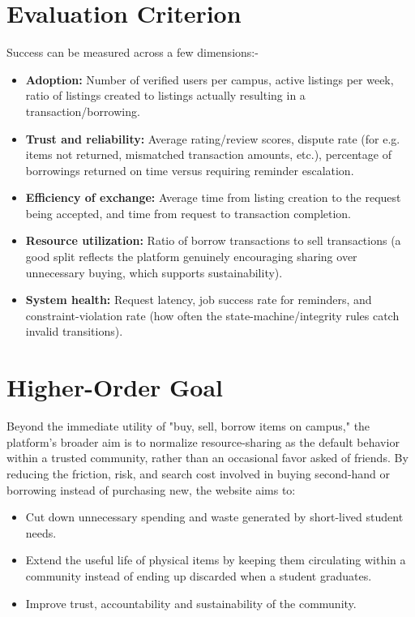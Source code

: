 \documentclass[12pt,a4paper]{article}
\begin{document}
\section{Evaluation Criterion}
Success can be measured across a few dimensions:-
\begin{itemize}[leftmargin=0.7cm]
    \item \textbf{Adoption:} Number of verified users per campus, active listings per week, ratio of listings created to listings actually resulting in a transaction/borrowing.
    \item \textbf{Trust and reliability:} Average rating/review scores, dispute rate (for e.g. items not returned, mismatched transaction amounts, etc.), percentage of borrowings returned on time versus requiring reminder escalation.
    \item \textbf{Efficiency of exchange:} Average time from listing creation to the request being accepted, and time from request to transaction completion.
    \item \textbf{Resource utilization:} Ratio of borrow transactions to sell transactions (a good split reflects the platform genuinely encouraging sharing over unnecessary buying, which supports sustainability).
    \item \textbf{System health:} Request latency, job success rate for reminders, and constraint-violation rate (how often the state-machine/integrity rules catch invalid transitions).
\end{itemize}

\section{Higher-Order Goal}
Beyond the immediate utility of "buy, sell, borrow items on campus," the platform's broader aim is to normalize resource-sharing as the default behavior within a trusted community, rather than an occasional favor asked of friends. By reducing the friction, risk, and search cost involved in buying second-hand or borrowing instead of purchasing new, the website aims to:
\begin{itemize}[leftmargin=0.7cm]
    \item Cut down unnecessary spending and waste generated by short-lived student needs.
    \item Extend the useful life of physical items by keeping them circulating within a community instead of ending up discarded when a student graduates.
    \item Improve trust, accountability and sustainability of the community.
\end{itemize}
\end{document}
